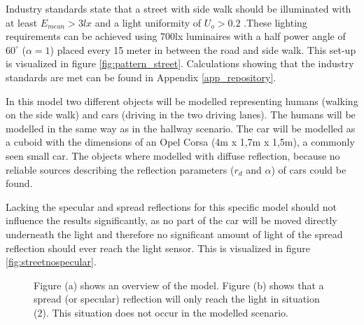 Industry standards state that a street with side walk should be illuminated with at least $E_{mean} > 3lx$ and a light uniformity of $U_o > 0.2$ \cite{HandboekBestaandeBouw}.These lighting requirements can be achieved using 700lx luminaires with a half power angle of $60^{\circ}$ ($\alpha = 1$) placed every 15 meter in between the road and side walk. This set-up is visualized in figure \ref{fig:pattern_street}. Calculations showing that the industry standards are met can be found in Appendix \ref{app_repository}.

In this model two different objects will be modelled representing humans (walking on the side walk) and cars (driving in the two driving lanes). The humans will be modelled in the same way as in the hallway scenario. The car will be modelled as a cuboid with the dimensions of an Opel Corsa (4m x 1,7m x 1,5m), a commonly seen small car. The objects where modelled with diffuse reflection, because no reliable sources describing the reflection parameters ($r_d$ and $\alpha$) of cars could be found.

Lacking the specular and spread reflections for this specific model should not influence the results significantly, as no part of the car will be moved directly underneath the light and therefore no significant amount of light of the spread reflection should ever reach the light sensor. This is visualized in figure \ref{fig:streetnospecular}.

\begin{figure}
	\centering     %
	\caption{Figure (a) shows an overview of the model. Figure (b) shows that a spread (or specular) reflection will only reach the light in situation (2). This situation does not occur in the modelled scenario.}
\end{figure}

